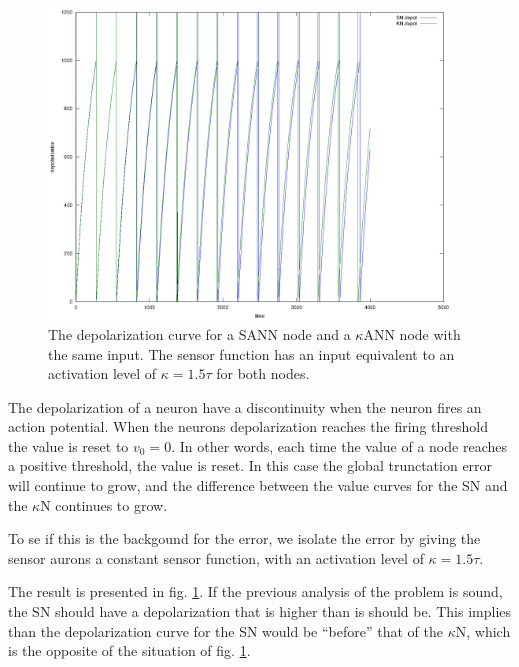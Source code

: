 \begin{figure}[hbt!]
	\centering
		\includegraphics[width=0.95\textwidth]{eps_comparison_between_KN_and_SN_ConstKappa.eps}
	\caption{The depolarization curve for a SANN node and a $\kappa$ANN node with the same input. The sensor function has an input equivalent to an activation level of $\kappa = 1.5 \tau$ for both nodes.} %
	\label{figComparisonBetweenSsensorAndKsensorDepolCurveCONStActivityLevel}
\end{figure}

The depolarization of a neuron have a discontinuity when the neuron fires an action potential. 
When the neurons depolarization reaches the firing threshold the value is reset to $v_0 = 0$.
In other words, each time the value of a node reaches a positive threshold, the value is reset.
In this case the global trunctation error will continue to grow, and the difference between the value curves for the SN and the $\kappa$N continues to grow. %

To se if this is the backgound for the error, we isolate the error by giving the sensor aurons a constant sensor function, with an activation level of $\kappa = 1.5 \tau$.

The result is presented in fig. \ref{figComparisonBetweenSsensorAndKsensorDepolCurveCONStActivityLevel}. %
If the previous analysis of the problem is sound, the SN should have a depolarization that is higher than is should be.
This implies than the depolarization curve for the SN would be ``before'' that of the $\kappa$N, which is the opposite of the situation of fig. \ref{figComparisonBetweenSsensorAndKsensorDepolCurveCONStActivityLevel}.





